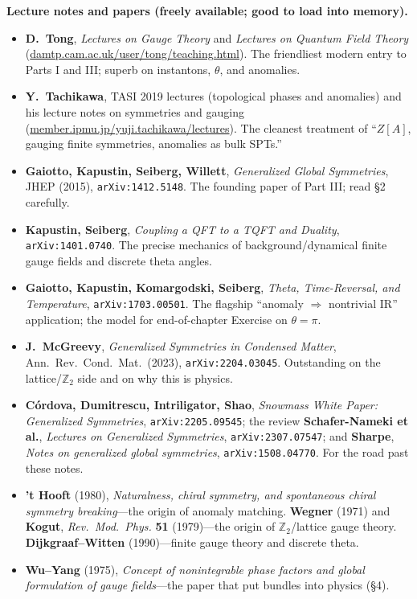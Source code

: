 \documentclass[11pt]{article}
\newcommand{\Ztwo}{\mathbb{Z}_2}
\begin{document}
\medskip
\noindent\textbf{Lecture notes and papers (freely available; good to load into memory).}
\begin{itemize}\setlength{\itemsep}{2pt}
\item \textbf{D.\ Tong}, \emph{Lectures on Gauge Theory} and \emph{Lectures on Quantum
Field Theory} (\url{damtp.cam.ac.uk/user/tong/teaching.html}). The friendliest modern
entry to Parts I and III; superb on instantons, $\theta$, and anomalies.
\item \textbf{Y.\ Tachikawa}, TASI 2019 lectures (topological phases and anomalies) and
his lecture notes on symmetries and gauging
(\url{member.ipmu.jp/yuji.tachikawa/lectures}). The cleanest treatment of
``$Z[A]$, gauging finite symmetries, anomalies as bulk SPTs.''
\item \textbf{Gaiotto, Kapustin, Seiberg, Willett}, \emph{Generalized Global
Symmetries}, JHEP (2015), \texttt{arXiv:1412.5148}. The founding paper of Part III; read
\S2 carefully.
\item \textbf{Kapustin, Seiberg}, \emph{Coupling a QFT to a TQFT and Duality},
\texttt{arXiv:1401.0740}. The precise mechanics of background/dynamical finite gauge
fields and discrete theta angles.
\item \textbf{Gaiotto, Kapustin, Komargodski, Seiberg}, \emph{Theta, Time-Reversal, and
Temperature}, \texttt{arXiv:1703.00501}. The flagship ``anomaly $\Rightarrow$
nontrivial IR'' application; the model for end-of-chapter Exercise on $\theta=\pi$.
\item \textbf{J.\ McGreevy}, \emph{Generalized Symmetries in Condensed Matter}, Ann.\
Rev.\ Cond.\ Mat.\ (2023), \texttt{arXiv:2204.03045}. Outstanding on the lattice/$\Ztwo$
side and on why this is physics.
\item \textbf{C\'ordova, Dumitrescu, Intriligator, Shao}, \emph{Snowmass White Paper:
Generalized Symmetries}, \texttt{arXiv:2205.09545}; the review
\textbf{Schafer-Nameki et al.}, \emph{Lectures on Generalized Symmetries},
\texttt{arXiv:2307.07547}; and \textbf{Sharpe}, \emph{Notes on generalized global
symmetries}, \texttt{arXiv:1508.04770}. For the road past these notes.
\item \textbf{'t Hooft} (1980), \emph{Naturalness, chiral symmetry, and spontaneous
chiral symmetry breaking}---the origin of anomaly matching. \textbf{Wegner} (1971) and
\textbf{Kogut}, \emph{Rev.\ Mod.\ Phys.} \textbf{51} (1979)---the origin of
$\Ztwo$/lattice gauge theory. \textbf{Dijkgraaf--Witten} (1990)---finite gauge theory
and discrete theta.
\item \textbf{Wu--Yang} (1975), \emph{Concept of nonintegrable phase factors and global
formulation of gauge fields}---the paper that put bundles into physics (\S4).
\end{itemize}
\end{document}
